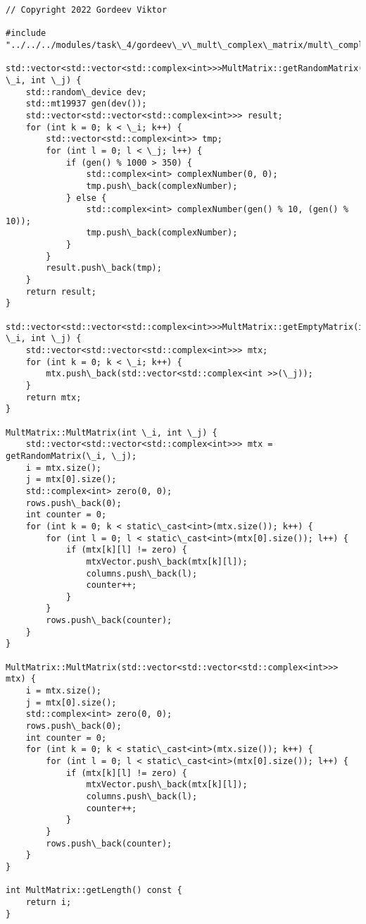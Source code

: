 \documentclass{report}
\begin{document}
\begin{lstlisting}
// Copyright 2022 Gordeev Viktor

#include "../../../modules/task\_4/gordeev\_v\_mult\_complex\_matrix/mult\_complex\_matrix.h"

std::vector<std::vector<std::complex<int>>>MultMatrix::getRandomMatrix(int \_i, int \_j) {
    std::random\_device dev;
    std::mt19937 gen(dev());
    std::vector<std::vector<std::complex<int>>> result;
    for (int k = 0; k < \_i; k++) {
        std::vector<std::complex<int>> tmp;
        for (int l = 0; l < \_j; l++) {
            if (gen() % 1000 > 350) {
                std::complex<int> complexNumber(0, 0);
                tmp.push\_back(complexNumber);
            } else {
                std::complex<int> complexNumber(gen() % 10, (gen() % 10));
                tmp.push\_back(complexNumber);
            }
        }
        result.push\_back(tmp);
    }
    return result;
}

std::vector<std::vector<std::complex<int>>>MultMatrix::getEmptyMatrix(int \_i, int \_j) {
    std::vector<std::vector<std::complex<int>>> mtx;
    for (int k = 0; k < \_i; k++) {
        mtx.push\_back(std::vector<std::complex<int >>(\_j));
    }
    return mtx;
}

MultMatrix::MultMatrix(int \_i, int \_j) {
    std::vector<std::vector<std::complex<int>>> mtx = getRandomMatrix(\_i, \_j);
    i = mtx.size();
    j = mtx[0].size();
    std::complex<int> zero(0, 0);
    rows.push\_back(0);
    int counter = 0;
    for (int k = 0; k < static\_cast<int>(mtx.size()); k++) {
        for (int l = 0; l < static\_cast<int>(mtx[0].size()); l++) {
            if (mtx[k][l] != zero) {
                mtxVector.push\_back(mtx[k][l]);
                columns.push\_back(l);
                counter++;
            }
        }
        rows.push\_back(counter);
    }
}

MultMatrix::MultMatrix(std::vector<std::vector<std::complex<int>>> mtx) {
    i = mtx.size();
    j = mtx[0].size();
    std::complex<int> zero(0, 0);
    rows.push\_back(0);
    int counter = 0;
    for (int k = 0; k < static\_cast<int>(mtx.size()); k++) {
        for (int l = 0; l < static\_cast<int>(mtx[0].size()); l++) {
            if (mtx[k][l] != zero) {
                mtxVector.push\_back(mtx[k][l]);
                columns.push\_back(l);
                counter++;
            }
        }
        rows.push\_back(counter);
    }
}

int MultMatrix::getLength() const {
    return i;
}


\end{lstlisting}
\end{document}
